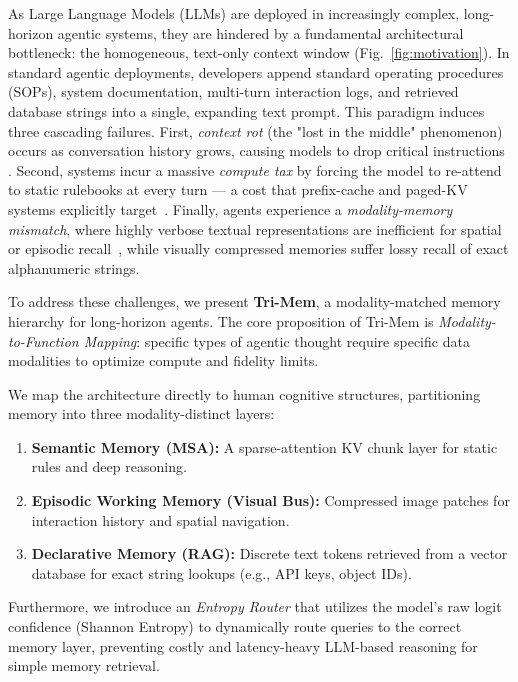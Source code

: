 \documentclass[conference]{IEEEtran}
\begin{document}
As Large Language Models (LLMs) are deployed in increasingly complex, long-horizon agentic systems, they are hindered by a fundamental architectural bottleneck: the homogeneous, text-only context window (Fig.~\ref{fig:motivation}). In standard agentic deployments, developers append standard operating procedures (SOPs), system documentation, multi-turn interaction logs, and retrieved database strings into a single, expanding text prompt. This paradigm induces three cascading failures. First, \textit{context rot} (the "lost in the middle" phenomenon) occurs as conversation history grows, causing models to drop critical instructions \cite{liu2023lost}. Second, systems incur a massive \textit{compute tax} by forcing the model to re-attend to static rulebooks at every turn --- a cost that prefix-cache and paged-KV systems explicitly target~\cite{vllm2023}. Finally, agents experience a \textit{modality-memory mismatch}, where highly verbose textual representations are inefficient for spatial or episodic recall~\cite{deepseekocr,vist2025}, while visually compressed memories suffer lossy recall of exact alphanumeric strings.

To address these challenges, we present \textbf{Tri-Mem}, a modality-matched memory hierarchy for long-horizon agents. The core proposition of Tri-Mem is \textit{Modality-to-Function Mapping}: specific types of agentic thought require specific data modalities to optimize compute and fidelity limits.

We map the architecture directly to human cognitive structures, partitioning memory into three modality-distinct layers:
\begin{enumerate}
    \item \textbf{Semantic Memory (MSA):} A sparse-attention KV chunk layer for static rules and deep reasoning.
    \item \textbf{Episodic Working Memory (Visual Bus):} Compressed image patches for interaction history and spatial navigation.
    \item \textbf{Declarative Memory (RAG):} Discrete text tokens retrieved from a vector database for exact string lookups (e.g., API keys, object IDs).
\end{enumerate}

Furthermore, we introduce an \textit{Entropy Router} that utilizes the model's raw logit confidence (Shannon Entropy) to dynamically route queries to the correct memory layer, preventing costly and latency-heavy LLM-based reasoning for simple memory retrieval.
\end{document}

